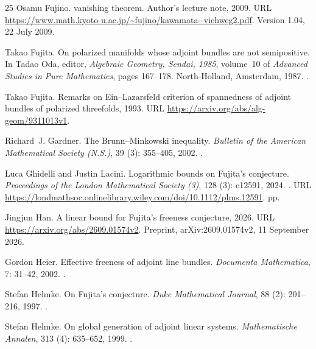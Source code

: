 \begin{thebibliography}{25}
Osamu Fujino.
 vanishing theorem.
\newblock Author's lecture note, 2009.
\newblock URL \url{https://www.math.kyoto-u.ac.jp/~fujino/kawamata--viehweg2.pdf}.
\newblock Version 1.04, 22 July 2009.

Takao Fujita.
\newblock On polarized manifolds whose adjoint bundles are not semipositive.
\newblock In Tadao Oda, editor, \emph{Algebraic Geometry, Sendai, 1985}, volume~10 of \emph{Advanced Studies in Pure Mathematics}, pages 167--178. North-Holland, Amsterdam, 1987.
\newblock {}.

Takao Fujita.
\newblock Remarks on {Ein--Lazarsfeld} criterion of spannedness of adjoint bundles of polarized threefolds, 1993.
\newblock URL \url{https://arxiv.org/abs/alg-geom/9311013v1}.

Richard~J. Gardner.
\newblock The {Brunn--Minkowski} inequality.
\newblock \emph{Bulletin of the American Mathematical Society (N.S.)}, 39 (3): 355--405, 2002.
\newblock {}.

Luca Ghidelli and Justin Lacini.
\newblock Logarithmic bounds on {Fujita}'s conjecture.
\newblock \emph{Proceedings of the London Mathematical Society (3)}, 128 (3): e12591, 2024.
\newblock {}.
\newblock URL \url{https://londmathsoc.onlinelibrary.wiley.com/doi/10.1112/plms.12591}.
 pp.

Jingjun Han.
\newblock A linear bound for {Fujita}'s freeness conjecture, 2026.
\newblock URL \url{https://arxiv.org/abs/2609.01574v2}.
\newblock Preprint, arXiv:2609.01574v2, 11 September 2026.

Gordon Heier.
\newblock Effective freeness of adjoint line bundles.
\newblock \emph{Documenta Mathematica}, 7: 31--42, 2002.
\newblock {}.

Stefan Helmke.
\newblock On {Fujita}'s conjecture.
\newblock \emph{Duke Mathematical Journal}, 88 (2): 201--216, 1997.
\newblock {}.

Stefan Helmke.
\newblock On global generation of adjoint linear systems.
\newblock \emph{Mathematische Annalen}, 313 (4): 635--652, 1999.
\newblock {}.


\end{thebibliography}
